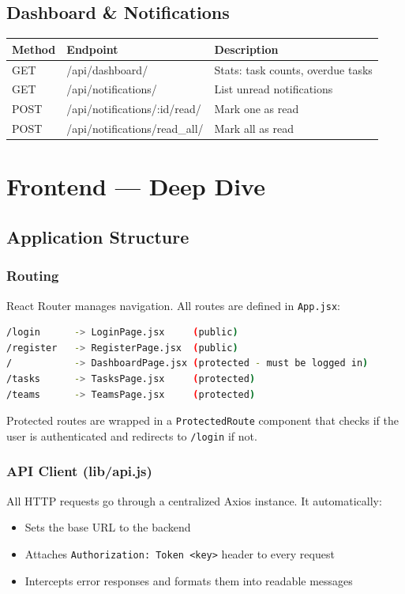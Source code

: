 \documentclass[12pt,a4paper]{article}
\begin{document}
\subsection{Dashboard \& Notifications}
\begin{center}
\begin{tabularx}{\textwidth}{llX}
\toprule
\textbf{Method} & \textbf{Endpoint} & \textbf{Description} \\
\midrule
GET & /api/dashboard/ & Stats: task counts, overdue tasks \\
GET & /api/notifications/ & List unread notifications \\
POST & /api/notifications/:id/read/ & Mark one as read \\
POST & /api/notifications/read\_all/ & Mark all as read \\
\bottomrule
\end{tabularx}
\end{center}


\section{Frontend — Deep Dive}

\subsection{Application Structure}

\subsubsection{Routing}
React Router manages navigation. All routes are defined in \texttt{App.jsx}:

\begin{lstlisting}[language=bash]
/login      -> LoginPage.jsx     (public)
/register   -> RegisterPage.jsx  (public)
/           -> DashboardPage.jsx (protected - must be logged in)
/tasks      -> TasksPage.jsx     (protected)
/teams      -> TeamsPage.jsx     (protected)
\end{lstlisting}

Protected routes are wrapped in a \texttt{ProtectedRoute} component that checks if the user is authenticated and redirects to \texttt{/login} if not.

\subsubsection{API Client (lib/api.js)}
All HTTP requests go through a centralized Axios instance. It automatically:
\begin{itemize}
    \item Sets the base URL to the backend
    \item Attaches \texttt{Authorization: Token <key>} header to every request
    \item Intercepts error responses and formats them into readable messages
\end{itemize}
\end{document}
